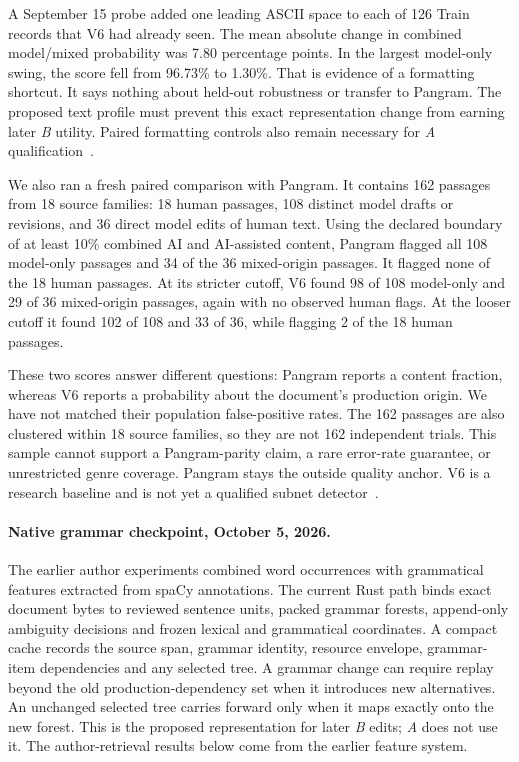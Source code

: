 A September 15 probe added one leading ASCII
space to each of 126 Train records that V6 had already seen. The mean absolute
change in combined model/mixed probability was 7.80 percentage points. In the
largest model-only swing, the score fell from 96.73\% to 1.30\%. That is evidence
of a formatting shortcut. It says nothing about held-out robustness or transfer
to Pangram. The proposed text profile must prevent this exact representation
change from earning later \textit{B} utility. Paired formatting controls also
remain necessary for \textit{A} qualification~\cite{boundaryspace}.

We also ran a fresh paired comparison with Pangram. It contains 162 passages
from 18 source families: 18 human passages, 108 distinct model drafts or
revisions, and 36 direct model edits of human text. Using the declared boundary
of at least 10\% combined AI and AI-assisted content, Pangram flagged all
108 model-only passages and 34 of the 36 mixed-origin passages. It flagged none
of the 18 human passages. At its stricter cutoff, V6 found 98 of 108 model-only
and 29 of 36 mixed-origin passages, again with no observed human flags. At the
looser cutoff it found 102 of 108 and 33 of 36, while flagging 2 of the 18 human
passages.

These two scores answer different questions: Pangram reports a content
fraction, whereas V6 reports a probability about the document's production
origin. We have not matched their population false-positive rates. The 162
passages are also clustered within 18 source families, so they are not 162
independent trials. This sample cannot support a Pangram-parity claim, a rare
error-rate guarantee, or unrestricted genre coverage. Pangram stays the outside
quality anchor. V6 is a research baseline and is not yet a qualified subnet
detector~\cite{detectorv6}.

\paragraph{Native grammar checkpoint, October 5, 2026.}
The earlier author experiments combined word occurrences with grammatical
features extracted from spaCy annotations. The current Rust path binds exact
document bytes to reviewed sentence units, packed grammar forests, append-only
ambiguity decisions and frozen lexical and grammatical coordinates. A compact
cache records the source span, grammar identity, resource envelope, grammar-item
dependencies and any selected tree. A grammar change can require replay beyond
the old production-dependency set when it introduces new alternatives.
An unchanged selected tree carries forward only when it maps exactly onto the
new forest. This is the proposed representation for later \textit{B} edits;
\textit{A} does not use it. The author-retrieval results below come from the
earlier feature system.


